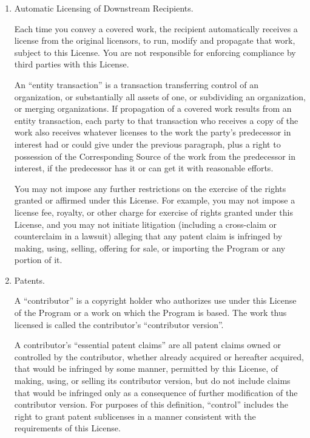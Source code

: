 \begin{enumerate}
  \item Automatic Licensing of Downstream Recipients.

        Each time you convey a covered work, the recipient automatically
        receives a license from the original licensors, to run, modify and
        propagate that work, subject to this License.  You are not responsible
        for enforcing compliance by third parties with this License.

        An ``entity transaction'' is a transaction transferring control of an
        organization, or substantially all assets of one, or subdividing an
        organization, or merging organizations.  If propagation of a covered
        work results from an entity transaction, each party to that
        transaction who receives a copy of the work also receives whatever
        licenses to the work the party's predecessor in interest had or could
        give under the previous paragraph, plus a right to possession of the
        Corresponding Source of the work from the predecessor in interest, if
        the predecessor has it or can get it with reasonable efforts.

        You may not impose any further restrictions on the exercise of the
        rights granted or affirmed under this License.  For example, you may
        not impose a license fee, royalty, or other charge for exercise of
        rights granted under this License, and you may not initiate litigation
        (including a cross-claim or counterclaim in a lawsuit) alleging that
        any patent claim is infringed by making, using, selling, offering for
        sale, or importing the Program or any portion of it.

  \item Patents.

        A ``contributor'' is a copyright holder who authorizes use under this
        License of the Program or a work on which the Program is based.  The
        work thus licensed is called the contributor's ``contributor version''.

        A contributor's ``essential patent claims'' are all patent claims
        owned or controlled by the contributor, whether already acquired or
        hereafter acquired, that would be infringed by some manner, permitted
        by this License, of making, using, or selling its contributor version,
        but do not include claims that would be infringed only as a
        consequence of further modification of the contributor version.  For
        purposes of this definition, ``control'' includes the right to grant
        patent sublicenses in a manner consistent with the requirements of
        this License.


\end{enumerate}

